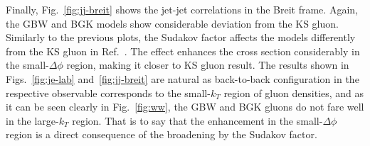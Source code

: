 \documentclass[12pt]{article}
\numberwithin{equation}{section}
\numberwithin{table}{section}
\numberwithin{figure}{section}
\begin{document}
Finally, Fig.~\ref{fig:jj-breit} shows the jet-jet correlations in the Breit frame. Again, the GBW and BGK models show considerable deviation from the KS gluon. Similarly to the previous plots, the Sudakov factor affects the models differently from the KS gluon in Ref.~\cite{vanHameren:2021sqc}.
The effect enhances the cross section considerably in the small-$\Delta\phi$ region, making it closer to KS gluon result.
The results shown in Figs.~\ref{fig:je-lab} and~\ref{fig:jj-breit} are natural as back-to-back configuration in the respective observable corresponds to the small-$k_T$ region of gluon densities, and as it can be seen clearly in Fig.~\ref{fig:ww}, the GBW and BGK gluons do not fare well in the large-$k_T$ region. 
That is to say that the enhancement in the small-$\Delta\phi$ region is a direct consequence of the broadening by the Sudakov factor. 
\end{document}
